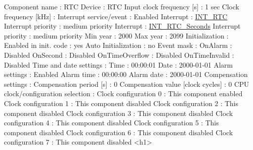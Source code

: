 \begin{DoxyCode}
            Component name                                 : RTC
            Device                                         : RTC
            Input clock frequency [s]                      : 1 sec
            Clock frequency [kHz]                          : 
            Interrupt service/event                        : Enabled
              Interrupt                                    : \hyperlink{group___interrupt__vector__numbers_gga5f3656e2a154b64aa378a2f3856c3a8daa4162d8752ffcf07bd0b1197f8c68f44}{INT\_RTC}
              Interrupt priority                           : medium priority
              Interrupt                                    : \hyperlink{group___interrupt__vector__numbers_gga5f3656e2a154b64aa378a2f3856c3a8da45c91289c03c8e8e65f1993cef955930}{INT\_RTC\_Seconds}
              Interrupt priority                           : medium priority
            Min year                                       : 2000
            Max year                                       : 2099
            Initialization                                 : 
              Enabled in init. code                        : yes
              Auto Initialization                          : no
              Event mask                                   : 
                OnAlarm                                    : Disabled
                OnSecond                                   : Disabled
                OnTimeOverflow                             : Disabled
                OnTimeInvalid                              : Disabled
              Time and date settings                       : 
                Time                                       : 00:00:01
                Date                                       : 2000-01-01
              Alarm settings                               : Enabled
                Alarm time                                 : 00:00:00
                Alarm date                                 : 2000-01-01
              Compensation settings                        : 
                Compensation period [s]                    : 0
                Compensation value [clock cycles]          : 0
            CPU clock/configuration selection              : 
              Clock configuration 0                        : This component enabled
              Clock configuration 1                        : This component disabled
              Clock configuration 2                        : This component disabled
              Clock configuration 3                        : This component disabled
              Clock configuration 4                        : This component disabled
              Clock configuration 5                        : This component disabled
              Clock configuration 6                        : This component disabled
              Clock configuration 7                        : This component disabled
<h1>
\end{DoxyCode}
